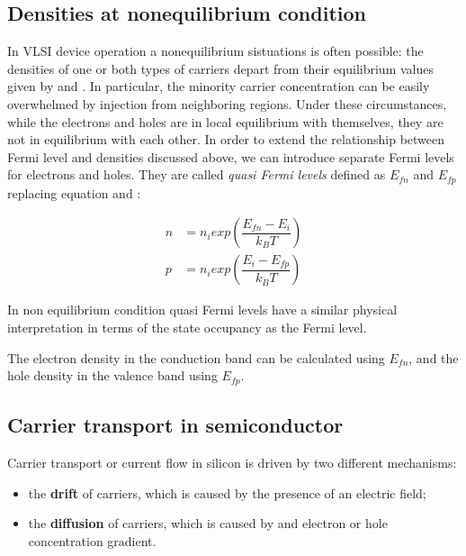 \subsection{Densities at nonequilibrium condition}

In VLSI device operation a nonequilibrium sistuations is often possible: the densities of one or both types of carriers depart from their equilibrium values given by  and .
In particular, the minority carrier concentration can be easily overwhelmed by injection from neighboring regions. Under these circumstances, while the electrons and holes are in local equilibrium with themselves, they are not in equilibrium with each other. In order to extend the relationship between Fermi level and densities discussed above, we can introduce separate Fermi levels for electrons and holes. They are called \textit{quasi Fermi levels} defined as $E_{fn}$ and $E_{fp}$ replacing equation  and :

\begin{align}
n & = n_i exp\left(\dfrac{E_{fn}-E_i}{k_BT}\right) \label{eq: non eq n density mb}\\
p & = n_i exp\left(\dfrac{E_i-E_{fp}}{k_BT}\right)  \label{eq: non eq p density mb}
\end{align}

In non equilibrium condition quasi Fermi levels have a similar physical interpretation in terms of the state occupancy as the Fermi level.
\begin{Osservazione}
The electron density in the conduction band can be calculated using $E_{fn}$, and the hole density in the valence band using $E_{fp}$.
\end{Osservazione}

\subsection{Carrier transport in semiconductor}
\label{sec: carrier transport}

Carrier transport or current flow in silicon is driven by two different mechanisms:
\begin{itemize}
\item the \textbf{drift} of carriers, which is caused by the presence of an electric field;
\item the \textbf{diffusion} of carriers, which is caused by and electron or hole concentration gradient.
\end{itemize}


